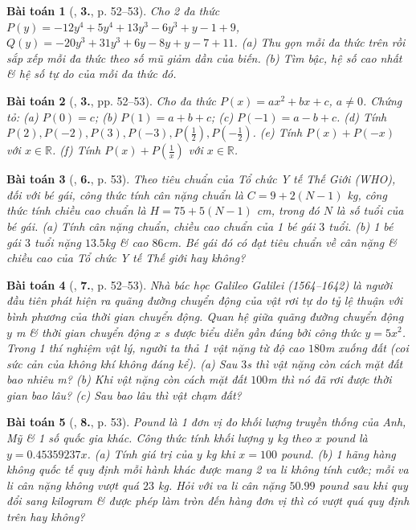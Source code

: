\documentclass{article}
\numberwithin{equation}{section}
\newtheorem{baitoan}{Bài toán}
\begin{document}
\begin{baitoan}[\cite{SGK_Toan_7_Canh_Dieu_tap_2}, \textbf{3.}, p. 52--53]
	Cho 2 đa thức $P(y) = -12y^4 + 5y^4 + 13y^3 - 6y^3 + y -1 + 9$, $Q(y) = -20y^3 + 31y^3 + 6y - 8y + y - 7 + 11$. (a) Thu gọn mỗi đa thức trên rồi sắp xếp mỗi đa thức theo số mũ giảm dần của biến. (b) Tìm bậc, hệ số cao nhất \& hệ số tự do của mỗi đa thức đó.
\end{baitoan}

\begin{baitoan}[\cite{SGK_Toan_7_Canh_Dieu_tap_2}, \textbf{3.}, pp. 52--53]
	Cho đa thức $P(x) = ax^2 + bx + c$, $a\ne0$. Chứng tỏ: (a) $P(0) = c$; (b) $P(1) = a + b + c$; (c) $P(-1) = a - b + c$. (d) Tính $P(2),P(-2),P(3),P(-3),P\left(\frac{1}{2}\right),P\left(-\frac{1}{2}\right)$. (e) Tính $P(x) + P(-x)$ với $x\in\mathbb{R}$. (f) Tính $P(x) + P\left(\frac{1}{x}\right)$ với $x\in\mathbb{R}$.
\end{baitoan}

\begin{baitoan}[\cite{SGK_Toan_7_Canh_Dieu_tap_2}, \textbf{6.}, p. 53]
	Theo tiêu chuẩn của Tổ chức Y tế Thế Giới (WHO), đối với bé gái, công thức tính cân nặng chuẩn là $C = 9 + 2(N - 1)$ \emph{kg}, công thức tính chiều cao chuẩn là $H = 75 + 5(N - 1)$ \emph{cm}, trong đó $N$ là số tuổi của bé gái. (a) Tính cân nặng chuẩn, chiều cao chuẩn của 1 bé gái $3$ tuổi. (b) 1 bé gái $3$ tuổi nặng $13.5$\emph{kg} \& cao $86$\emph{cm}. Bé gái đó có đạt tiêu chuẩn về cân nặng \& chiều cao của Tổ chức Y tế Thế giới hay không?
\end{baitoan}

\begin{baitoan}[\cite{SGK_Toan_7_Canh_Dieu_tap_2}, \textbf{7.}, p. 52--53]
	Nhà bác học Galileo Galilei (1564--1642) là người đầu tiên phát hiện ra quãng đường chuyển động của vật rơi tự do tỷ lệ thuận với bình phương của thời gian chuyển động. Quan hệ giữa quãng đường chuyển động $y$ \emph{m} \& thời gian chuyển động $x$ \emph{s} được biểu diễn gần đúng bởi công thức $y = 5x^2$. Trong 1 thí nghiệm vật lý, người ta thả 1 vật nặng từ độ cao $180$\emph{m} xuống đất (coi sức cản của không khí không đáng kể). (a) Sau $3$\emph{s} thì vật nặng còn cách mặt đất bao nhiêu \emph{m}? (b) Khi vật nặng còn cách mặt đất $100$\emph{m} thì nó đã rơi được thời gian bao lâu? (c) Sau bao lâu thì vật chạm đất?
\end{baitoan}

\begin{baitoan}[\cite{SGK_Toan_7_Canh_Dieu_tap_2}, \textbf{8.}, p. 53]
	Pound là 1 đơn vị đo khối lượng truyền thống của Anh, Mỹ \& 1 số quốc gia khác. Công thức tính khối lượng $y$ \emph{kg} theo $x$ pound là $y = 0.45359237x$. (a) Tính giá trị của $y$ \emph{kg} khi $x = 100$ pound. (b) 1 hãng hàng không quốc tế quy định mỗi hành khác được mang 2 va li không tính cước; mỗi va li cân nặng không vượt quá $23$ \emph{kg}. Hỏi với va li cân nặng $50.99$ pound sau khi quy đổi sang kilogram \& được phép làm tròn đến hàng đơn vị thì có vượt quá quy định trên hay không?
\end{baitoan}
\end{document}
